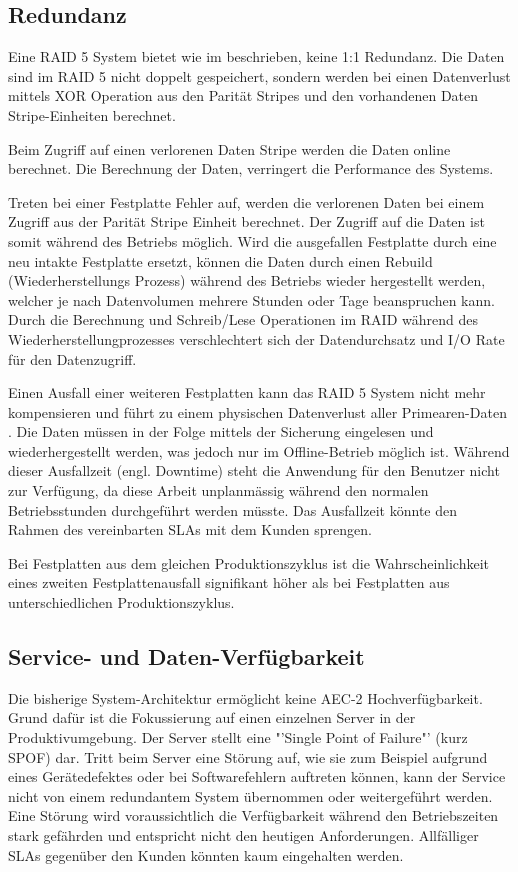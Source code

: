 \subsection{Redundanz}
Eine RAID 5 System bietet wie im  beschrieben, keine 1:1 Redundanz. Die Daten sind im RAID 5 nicht doppelt gespeichert, sondern werden bei einen Datenverlust mittels XOR Operation aus den Parität Stripes und den vorhandenen Daten Stripe-Einheiten berechnet. 

Beim Zugriff auf einen verlorenen Daten Stripe werden die Daten online berechnet. Die Berechnung der Daten, verringert die Performance des Systems.

Treten bei einer Festplatte Fehler auf, werden die verlorenen Daten bei einem Zugriff aus der Parität Stripe Einheit berechnet. Der Zugriff auf die Daten ist somit während des Betriebs möglich. Wird die ausgefallen Festplatte durch eine neu intakte Festplatte ersetzt, können die Daten durch einen Rebuild (Wiederherstellungs Prozess) während des Betriebs wieder hergestellt werden, welcher je nach Datenvolumen mehrere Stunden oder Tage beanspruchen kann. Durch die Berechnung und Schreib/Lese Operationen im RAID während des Wiederherstellungprozesses verschlechtert sich der Datendurchsatz und I/O Rate für den Datenzugriff.

Einen Ausfall einer weiteren Festplatten kann das RAID 5 System nicht mehr kompensieren und führt zu einem physischen Datenverlust aller \gls{Primearen-Daten} . Die Daten müssen in der Folge mittels der Sicherung eingelesen und wiederhergestellt werden, was jedoch nur im Offline-Betrieb möglich ist. Während dieser Ausfallzeit (engl. Downtime)  steht die Anwendung für den Benutzer nicht zur Verfügung, da diese Arbeit unplanmässig während den normalen Betriebsstunden durchgeführt werden müsste. Das Ausfallzeit könnte den Rahmen des vereinbarten SLAs  mit dem Kunden sprengen. 

Bei Festplatten aus dem gleichen Produktionszyklus ist die Wahrscheinlichkeit eines zweiten Festplattenausfall signifikant höher als bei Festplatten aus unterschiedlichen Produktionszyklus.

\subsection{Service- und Daten-Verfügbarkeit}
Die bisherige System-Architektur ermöglicht keine AEC-2 Hochverfügbarkeit. Grund dafür ist die Fokussierung auf einen einzelnen Server in der Produktivumgebung. Der Server stellt eine "'Single Point of Failure"' (kurz SPOF) dar. Tritt beim Server eine Störung auf, wie sie zum Beispiel aufgrund eines Gerätedefektes oder bei Softwarefehlern auftreten können, kann der Service nicht von einem redundantem System übernommen oder weitergeführt werden. Eine Störung wird voraussichtlich die Verfügbarkeit während den Betriebszeiten stark gefährden und entspricht nicht den heutigen Anforderungen. Allfälliger SLAs gegenüber den Kunden könnten kaum eingehalten werden.

